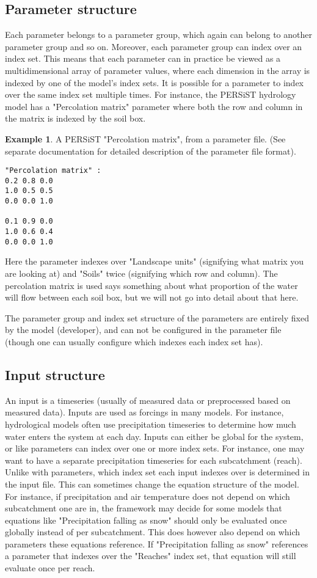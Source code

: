 \documentclass[11pt]{article}
\theoremstyle{definition}
\newtheorem{myexample}{Example}
\newenvironment{example}%
  {\begin{lrbox}{\examplebox}%
   \begin{minipage}{\dimexpr\linewidth-2\fboxsep}
   \begin{myexample}}%
  {\end{myexample}%
   \end{minipage}%
   \end{lrbox}%
   \begin{trivlist}
     \item[]\colorbox{silver}{\usebox\examplebox}
   \end{trivlist}}
\begin{document}
\subsection{Parameter structure}
Each parameter belongs to a parameter group, which again can belong to another parameter group and so on. Moreover, each parameter group can index over an index set. This means that each parameter can in practice be viewed as a multidimensional array of parameter values, where each dimension in the array is indexed by one of the model's index sets. It is possible for a parameter to index over the same index set multiple times. For instance, the PERSiST hydrology model \cite{futter14} has a "Percolation matrix" parameter where both the row and column in the matrix is indexed by the soil box.

\begin{example}
A PERSiST "Percolation matrix", from a parameter file. (See separate documentation for detailed description of the parameter file format).
\begin{lstlisting}[style=textstyle]
"Percolation matrix" :
0.2 0.8 0.0
1.0 0.5 0.5
0.0 0.0 1.0

0.1 0.9 0.0
1.0 0.6 0.4
0.0 0.0 1.0
\end{lstlisting}
Here the parameter indexes over "Landscape units" (signifying what matrix you are looking at) and "Soils" twice (signifying which row and column). The percolation matrix is used says something about what proportion of the water will flow between each soil box, but we will not go into detail about that here.
\end{example}

The parameter group and index set structure of the parameters are entirely fixed by the model (developer), and can not be configured in the parameter file (though one can usually configure which indexes each index set has).

\subsection{Input structure}
An input is a timeseries (usually of measured data or preprocessed based on measured data). Inputs are used as forcings in many models. For instance, hydrological models often use precipitation timeseries to determine how much water enters the system at each day. Inputs can either be global for the system, or like parameters can index over one or more index sets. For instance, one may want to have a separate precipitation timeseries for each subcatchment (reach). Unlike with parameters, which index set each input indexes over is determined in the input file. This can sometimes change the equation structure of the model. For instance, if precipitation and air temperature does not depend on which subcatchment one are in, the framework may decide for some models that equations like "Precipitation falling as snow" should only be evaluated once globally instead of per subcatchment. This does however also depend on which parameters these equations reference. If "Precipitation falling as snow" references a parameter that indexes over the "Reaches" index set, that equation will still evaluate once per reach.
\end{document}
